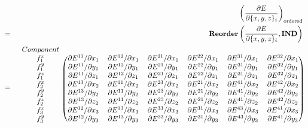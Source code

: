 \begin{eqnarray}
&& \left(
	\frac{\partial{E}}{\partial{\{x, y, z\}_i}}
\right)_{\mathrm{ordered}} \nonumber \\
& = &
\mathbf{Reorder}\left(
	\frac{\partial{E}}{\partial{\{x, y, z\}_i}}, \mathbf{IND}
\right) \nonumber \\
& = & \begin{blockarray}{ccccccc}
Component & & & & & & \\
\begin{block}{c(cccccc)}
f^x_1 &
\partial{E^{11}} / \partial{x_1} & \partial{E^{12}} / \partial{x_1} &
\partial{E^{21}} / \partial{x_1} & \partial{E^{22}} / \partial{x_1} &
\partial{E^{31}} / \partial{x_1} & \partial{E^{32}} / \partial{x_1} \\
f^y_1 &
\partial{E^{11}} / \partial{y_1} & \partial{E^{12}} / \partial{y_1} &
\partial{E^{21}} / \partial{y_1} & \partial{E^{22}} / \partial{y_1} &
\partial{E^{31}} / \partial{y_1} & \partial{E^{32}} / \partial{y_1} \\
f^z_1 &
\partial{E^{11}} / \partial{z_1} & \partial{E^{12}} / \partial{z_1} &
\partial{E^{21}} / \partial{z_1} & \partial{E^{22}} / \partial{z_1} &
\partial{E^{31}} / \partial{z_1} & \partial{E^{32}} / \partial{z_1} \\
%
f^x_2 &
\partial{E^{13}} / \partial{x_2} & \partial{E^{11}} / \partial{x_2} &
\partial{E^{23}} / \partial{x_2} & \partial{E^{21}} / \partial{x_2} &
\partial{E^{41}} / \partial{x_2} & \partial{E^{42}} / \partial{x_2} \\
f^y_2 &
\partial{E^{13}} / \partial{y_2} & \partial{E^{11}} / \partial{y_2} &
\partial{E^{23}} / \partial{y_2} & \partial{E^{21}} / \partial{y_2} &
\partial{E^{41}} / \partial{y_2} & \partial{E^{42}} / \partial{y_2} \\
f^z_2 &
\partial{E^{13}} / \partial{z_2} & \partial{E^{11}} / \partial{z_2} &
\partial{E^{23}} / \partial{z_2} & \partial{E^{21}} / \partial{z_2} &
\partial{E^{41}} / \partial{z_2} & \partial{E^{42}} / \partial{z_2} \\
%
f^x_3 &
\partial{E^{12}} / \partial{x_3} & \partial{E^{13}} / \partial{x_3} &
\partial{E^{33}} / \partial{x_3} & \partial{E^{31}} / \partial{x_3} &
\partial{E^{43}} / \partial{x_3} & \partial{E^{41}} / \partial{x_3} \\
f^y_3 &
\partial{E^{12}} / \partial{y_3} & \partial{E^{13}} / \partial{y_3} &
\partial{E^{33}} / \partial{y_3} & \partial{E^{31}} / \partial{y_3} &
\partial{E^{43}} / \partial{y_3} & \partial{E^{41}} / \partial{y_3} \\

\end{block}
\end{blockarray}
\end{eqnarray}
